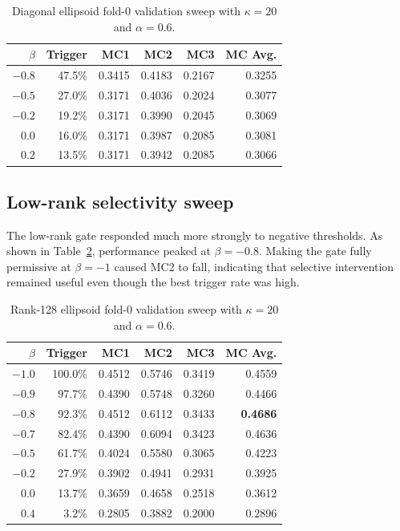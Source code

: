 \documentclass[11pt]{article}
\begin{document}
\begin{table}[ht]
\centering
\caption{Diagonal ellipsoid fold-0 validation sweep with $\kappa=20$ and
$\alpha=0.6$.}
\label{tab:diag-beta}
\begin{tabular}{rrrrrr}
\toprule
$\beta$ & Trigger & MC1 & MC2 & MC3 & MC Avg.\\
\midrule
$-0.8$ & 47.5\% & 0.3415 & 0.4183 & 0.2167 & 0.3255\\
$-0.5$ & 27.0\% & 0.3171 & 0.4036 & 0.2024 & 0.3077\\
$-0.2$ & 19.2\% & 0.3171 & 0.3990 & 0.2045 & 0.3069\\
$0.0$  & 16.0\% & 0.3171 & 0.3987 & 0.2085 & 0.3081\\
$0.2$  & 13.5\% & 0.3171 & 0.3942 & 0.2085 & 0.3066\\
\bottomrule
\end{tabular}
\end{table}

\subsection{Low-rank selectivity sweep}

The low-rank gate responded much more strongly to negative thresholds.  As
shown in Table~\ref{tab:lowrank-beta}, performance peaked at $\beta=-0.8$.
Making the gate fully permissive at $\beta=-1$ caused MC2 to fall, indicating
that selective intervention remained useful even though the best trigger rate
was high.

\begin{table}[ht]
\centering
\caption{Rank-128 ellipsoid fold-0 validation sweep with $\kappa=20$ and
$\alpha=0.6$.}
\label{tab:lowrank-beta}
\begin{tabular}{rrrrrr}
\toprule
$\beta$ & Trigger & MC1 & MC2 & MC3 & MC Avg.\\
\midrule
$-1.0$ & 100.0\% & 0.4512 & 0.5746 & 0.3419 & 0.4559\\
$-0.9$ & 97.7\%  & 0.4390 & 0.5748 & 0.3260 & 0.4466\\
$-0.8$ & 92.3\%  & 0.4512 & 0.6112 & 0.3433 & \textbf{0.4686}\\
$-0.7$ & 82.4\%  & 0.4390 & 0.6094 & 0.3423 & 0.4636\\
$-0.5$ & 61.7\%  & 0.4024 & 0.5580 & 0.3065 & 0.4223\\
$-0.2$ & 27.9\%  & 0.3902 & 0.4941 & 0.2931 & 0.3925\\
$0.0$  & 13.7\%  & 0.3659 & 0.4658 & 0.2518 & 0.3612\\
$0.4$  & 3.2\%   & 0.2805 & 0.3882 & 0.2000 & 0.2896\\
\bottomrule
\end{tabular}
\end{table}
\end{document}
